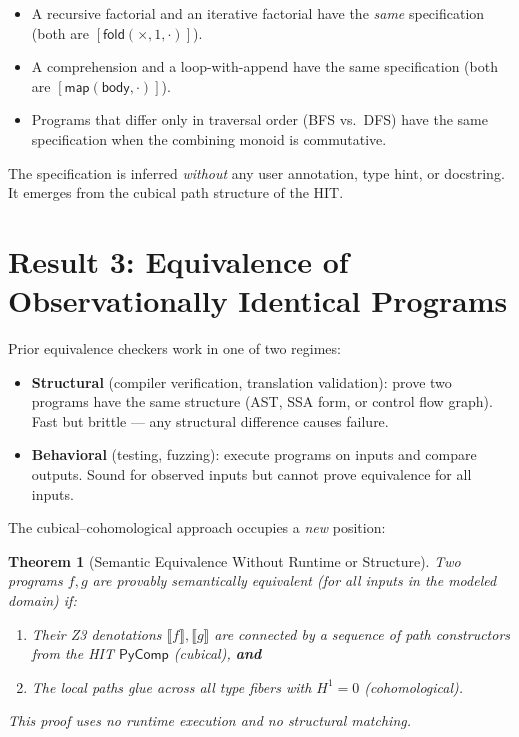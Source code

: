 \documentclass[11pt,a4paper]{report}
\theoremstyle{definition}
\theoremstyle{plain}
\newtheorem{theorem}[definition]{Theorem}
\newcommand{\den}[1]{\llbracket #1 \rrbracket}
\newcommand{\fold}{\mathsf{fold}}
\newcommand{\Hone}{H^1}
\begin{document}
\begin{itemize}
  \item A recursive factorial and an iterative factorial have the
    \emph{same} specification (both are $[\fold(\times, 1, \cdot)]$).
  \item A comprehension and a loop-with-append have the same
    specification (both are $[\mathsf{map}(\mathsf{body}, \cdot)]$).
  \item Programs that differ only in traversal order (BFS vs.\ DFS)
    have the same specification when the combining monoid is
    commutative.
\end{itemize}

The specification is inferred \emph{without} any user annotation,
type hint, or docstring.  It emerges from the cubical path structure
of the HIT.

\section{Result 3: Equivalence of Observationally Identical Programs}

Prior equivalence checkers work in one of two regimes:
\begin{itemize}
  \item \textbf{Structural} (compiler verification, translation
    validation): prove two programs have the same structure
    (AST, SSA form, or control flow graph).  Fast but brittle ---
    any structural difference causes failure.
  \item \textbf{Behavioral} (testing, fuzzing): execute programs on
    inputs and compare outputs.  Sound for observed inputs but
    cannot prove equivalence for all inputs.
\end{itemize}

The cubical--cohomological approach occupies a \emph{new} position:

\begin{theorem}[Semantic Equivalence Without Runtime or Structure]
\label{thm:semantic}
Two programs $f, g$ are provably semantically equivalent (for all
inputs in the modeled domain) if:
\begin{enumerate}
  \item Their Z3 denotations $\den{f}, \den{g}$ are connected by
    a sequence of path constructors from the HIT $\mathsf{PyComp}$
    (cubical), \textbf{and}
  \item The local paths glue across all type fibers with $\Hone = 0$
    (cohomological).
\end{enumerate}
This proof uses \emph{no runtime execution} and \emph{no structural
matching}.
\end{theorem}
\end{document}
